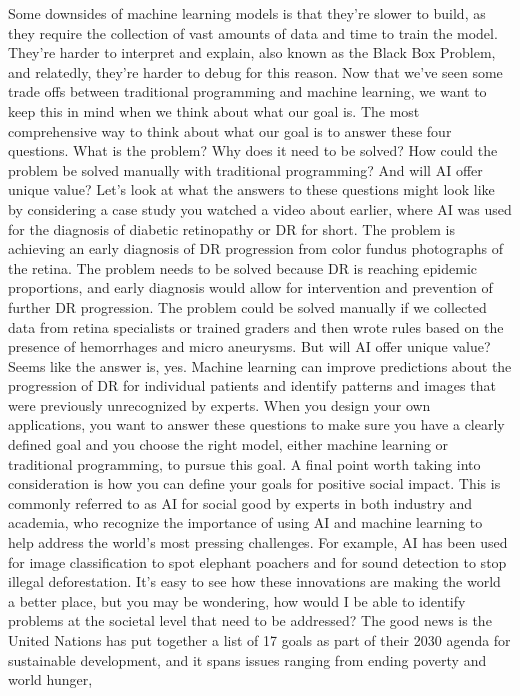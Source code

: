 Some downsides of machine learning models is that they're slower to build,
as they require the collection of vast amounts of data and time
to train the model.
They're harder to interpret and explain, also known as the Black Box Problem,
and relatedly, they're harder to debug for this reason.
Now that we've seen some trade offs between traditional programming
and machine learning, we want to keep this in mind
when we think about what our goal is.
The most comprehensive way to think about what our goal is
to answer these four questions.
What is the problem?
Why does it need to be solved?
How could the problem be solved manually with traditional programming?
And will AI offer unique value?
Let's look at what the answers to these questions
might look like by considering a case study
you watched a video about earlier, where AI
was used for the diagnosis of diabetic retinopathy or DR for short.
The problem is achieving an early diagnosis of DR progression
from color fundus photographs of the retina.
The problem needs to be solved because DR is reaching epidemic proportions,
and early diagnosis would allow for intervention and prevention
of further DR progression.
The problem could be solved manually if we collected data
from retina specialists or trained graders
and then wrote rules based on the presence of hemorrhages
and micro aneurysms.
But will AI offer unique value?
Seems like the answer is, yes.
Machine learning can improve predictions about the progression
of DR for individual patients and identify patterns and images that were
previously unrecognized by experts.
When you design your own applications, you
want to answer these questions to make sure you have a clearly defined goal
and you choose the right model, either machine
learning or traditional programming, to pursue this goal.
A final point worth taking into consideration
is how you can define your goals for positive social impact.
This is commonly referred to as AI for social good
by experts in both industry and academia, who
recognize the importance of using AI and machine learning to help address
the world's most pressing challenges.
For example, AI has been used for image classification
to spot elephant poachers and for sound detection
to stop illegal deforestation.
It's easy to see how these innovations are making the world a better place,
but you may be wondering, how would I be able to identify problems
at the societal level that need to be addressed?
The good news is the United Nations has put together a list of 17 goals
as part of their 2030 agenda for sustainable development,
and it spans issues ranging from ending poverty and world hunger,
